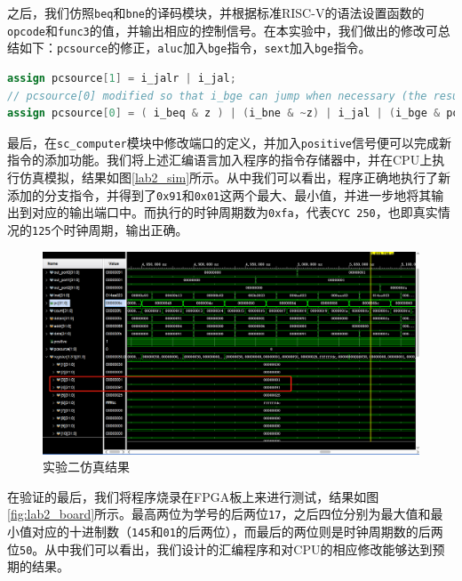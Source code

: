 \documentclass[a4paper,12pt]{article}
\begin{document}
    之后，我们仿照\verb|beq|和\verb|bne|的译码模块，并根据标准RISC-V的语法设置函数的\verb|opcode|和\verb|func3|的值，并输出相应的控制信号。在本实验中，我们做出的修改可总结如下：\verb|pcsource|的修正，\verb|aluc|加入\verb|bge|指令，\verb|sext|加入\verb|bge|指令。

\begin{lstlisting}[language=verilog]
assign pcsource[1] = i_jalr | i_jal;
// pcsource[0] modified so that i_bge can jump when necessary (the result of sub is finite)
assign pcsource[0] = ( i_beq & z ) | (i_bne & ~z) | i_jal | (i_bge & positive) ;
\end{lstlisting}

    最后，在\verb|sc_computer|模块中修改端口的定义，并加入\verb|positive|信号便可以完成新指令的添加功能。我们将上述汇编语言加入程序的指令存储器中，并在CPU上执行仿真模拟，结果如图\ref{lab2_sim}所示。从中我们可以看出，程序正确地执行了新添加的分支指令，并得到了\verb|0x91|和\verb|0x01|这两个最大、最小值，并进一步地将其输出到对应的输出端口中。而执行的时钟周期数为\verb|0xfa|，代表\verb|CYC 250|，也即真实情况的\verb|125|个时钟周期，输出正确。

    \begin{figure}[htbp]
        \centering
        \includegraphics[scale=0.5]{fig5.png}
        \caption{实验二仿真结果}
        \label{fig:lab2_sim}
    \end{figure}

    在验证的最后，我们将程序烧录在FPGA板上来进行测试，结果如图\ref{fig:lab2_board}所示。最高两位为学号的后两位\verb|17|，之后四位分别为最大值和最小值对应的十进制数（\verb|145|和\verb|01|的后两位），而最后的两位则是时钟周期数的后两位\verb|50|。从中我们可以看出，我们设计的汇编程序和对CPU的相应修改能够达到预期的结果。
\end{document}
